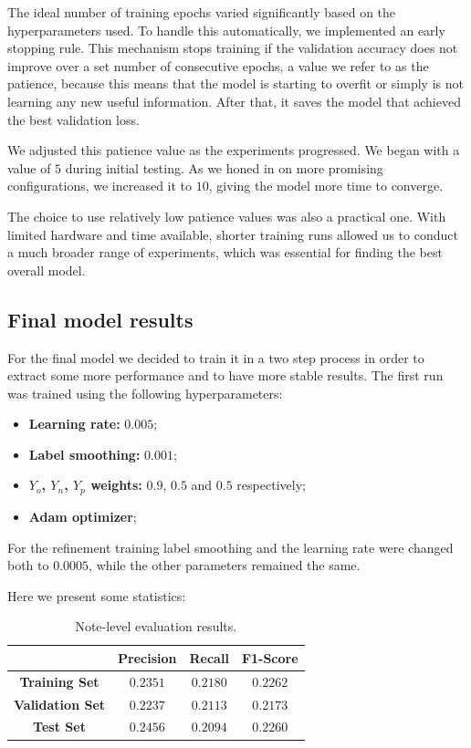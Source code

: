 \documentclass[10pt,twocolumn,letterpaper]{article}
\begin{document}
The ideal number of training epochs varied significantly based on the hyperparameters used. To handle this automatically, we implemented an early stopping rule. This mechanism stops training if the validation accuracy does not improve over a set number of consecutive epochs, a value we refer to as the patience, because this means that the model is starting to overfit or simply is not learning any new useful information. After that, it saves the model that achieved the best validation loss.

We adjusted this patience value as the experiments progressed. We began with a value of $\num{5}$ during initial testing. As we honed in on more promising configurations, we increased it to $\num{10}$, giving the model more time to converge.

The choice to use relatively low patience values was also a practical one. With limited hardware and time available, shorter training runs allowed us to conduct a much broader range of experiments, which was essential for finding the best overall model.

\subsection{Final model results}

For the final model we decided to train it in a two step process in order to extract some more performance and to have more stable results.
The first run was trained using the following hyperparameters:
\begin{itemize}
    \itemsep 0em
    \item \textbf{Learning rate:} $\num{0.005}$;
    \item \textbf{Label smoothing:} $\num{0.001}$;
    \item \textbf{$Y_o$, $Y_n$, $Y_p$ weights:} $0.\num{9}$, $\num{0.5}$ and $\num{0.5}$ respectively;
    \item \textbf{Adam optimizer};
\end{itemize}

For the refinement training label smoothing and the learning rate were changed both to $\num{0.0005}$, while the other parameters remained the same.

Here we present some statistics:
\begin{table}[h]
\centering
\begin{tabular}{|c|c|c|c|}
\hline
& \textbf{Precision} & \textbf{Recall} & \textbf{F1-Score} \\ \hline
\textbf{Training Set} & $\num{0.2351}$ & $\num{0.2180}$ & $\num{0.2262}$ \\ \hline
\textbf{Validation Set} & $\num{0.2237}$ & $\num{0.2113}$ & $\num{0.2173}$ \\ \hline
\textbf{Test Set} & $\num{0.2456}$ & $\num{0.2094}$ & $\num{0.2260}$ \\ \hline
\end{tabular}
\caption{Note-level evaluation results.}
\label{tab:note_results}
\end{table}
\end{document}
